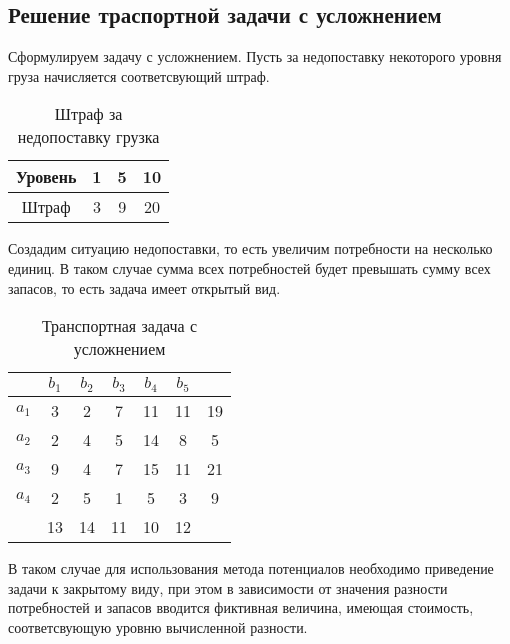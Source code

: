 \documentclass[../body.tex]{subfiles}
\begin{document}
\subsection{Решение траспортной задачи с усложнением}
Сформулируем задачу с усложнением. Пусть за недопоставку некоторого уровня груза начисляется соответсвующий штраф. 
\begin{table}[h]
    \centering
    \begin{tabular}{|c||c|c|c|}
        \hline
        Уровень & 1 & 5 & 10\\\hline
        Штраф & 3 & 9 & 20\\\hline
    \end{tabular}
    \caption{Штраф за недопоставку грузка}
    \label{tab:penalty}
\end{table}

Создадим ситуацию недопоставки, то есть увеличим потребности на несколько единиц. В таком случае сумма всех потребностей будет превышать сумму всех запасов, то есть задача имеет открытый вид.

\begin{table}[h]
    \centering
    \begin{tabular}{|c|c|c|c|c|c||c|}
        \hline
        & $b_1$ & $b_2$ & $b_3$ & $b_4$ & $b_5$ & \\\hline
        $a_1$ & 3 & 2 & 7 & 11 & 11 & 19\\\hline
        $a_2$ & 2 & 4 & 5 & 14 & 8 & 5\\\hline
        $a_3$ & 9 & 4 & 7 & 15 & 11 & 21\\\hline
        $a_4$ & 2 & 5 & 1 & 5 & 3 & 9\\\hline
        & 13 & 14 & 11 & 10 & 12 & \\\hline
    \end{tabular}
    \caption{Транспортная задача с усложнением}
    \label{tab:difficult_task}
\end{table}

В таком случае для использования метода потенциалов необходимо приведение задачи к закрытому виду, при этом в зависимости от значения разности потребностей и запасов вводится фиктивная величина, имеющая стоимость, соответсвующую уровню вычисленной разности. 
\end{document}
